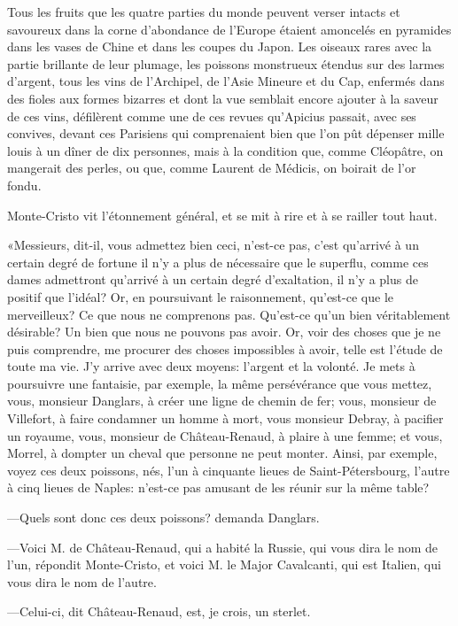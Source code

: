 Tous les fruits que les quatre parties du monde peuvent verser intacts et savoureux dans la corne d'abondance de l'Europe étaient amoncelés en pyramides dans les vases de Chine et dans les coupes du Japon. Les oiseaux rares avec la partie brillante de leur plumage, les poissons monstrueux étendus sur des larmes d'argent, tous les vins de l'Archipel, de l'Asie Mineure et du Cap, enfermés dans des fioles aux formes bizarres et dont la vue semblait encore ajouter à la saveur de ces vins, défilèrent comme une de ces revues qu'Apicius passait, avec ses convives, devant ces Parisiens qui comprenaient bien que l'on pût dépenser mille louis à un dîner de dix personnes, mais à la condition que, comme Cléopâtre, on mangerait des perles, ou que, comme Laurent de Médicis, on boirait de l'or fondu. 

Monte-Cristo vit l'étonnement général, et se mit à rire et à se railler tout haut. 

«Messieurs, dit-il, vous admettez bien ceci, n'est-ce pas, c'est qu'arrivé à un certain degré de fortune il n'y a plus de nécessaire que le superflu, comme ces dames admettront qu'arrivé à un certain degré d'exaltation, il n'y a plus de positif que l'idéal? Or, en poursuivant le raisonnement, qu'est-ce que le merveilleux? Ce que nous ne comprenons pas. Qu'est-ce qu'un bien véritablement désirable? Un bien que nous ne pouvons pas avoir. Or, voir des choses que je ne puis comprendre, me procurer des choses impossibles à avoir, telle est l'étude de toute ma vie. J'y arrive avec deux moyens: l'argent et la volonté. Je mets à poursuivre une fantaisie, par exemple, la même persévérance que vous mettez, vous, monsieur Danglars, à créer une ligne de chemin de fer; vous, monsieur de Villefort, à faire condamner un homme à mort, vous monsieur Debray, à pacifier un royaume, vous, monsieur de Château-Renaud, à plaire à une femme; et vous, Morrel, à dompter un cheval que personne ne peut monter. Ainsi, par exemple, voyez ces deux poissons, nés, l'un à cinquante lieues de Saint-Pétersbourg, l'autre à cinq lieues de Naples: n'est-ce pas amusant de les réunir sur la même table? 

—Quels sont donc ces deux poissons? demanda Danglars. 

—Voici M. de Château-Renaud, qui a habité la Russie, qui vous dira le nom de l'un, répondit Monte-Cristo, et voici M. le Major Cavalcanti, qui est Italien, qui vous dira le nom de l'autre. 

—Celui-ci, dit Château-Renaud, est, je crois, un sterlet. 

